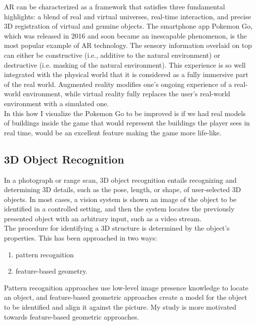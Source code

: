 \documentclass[a4paper]{report}
\begin{document}
AR can be characterized as a framework that satisfies three fundamental highlights: a blend of real and virtual universes, real-time interaction, and precise 3D registration of virtual and genuine objects. The smartphone app Pokemon Go, which was released in 2016 and soon became an inescapable phenomenon, is the most popular example of AR technology.
The sensory information overlaid on top can either be constructive (i.e., additive to the natural environment) or destructive (i.e. masking of the natural environment).
This experience is so well integrated with the physical world that it is considered as a fully immersive part of the real world. Augmented reality modifies one's ongoing experience of a real-world environment, while virtual reality fully replaces the user's real-world environment with a simulated one.
\\
In this how I visualize the Pokemon Go to be improved is if we had real models of buildings inside the game that would represent the buildings the player sees in real time, would be an excellent feature making the game more life-like.
\newpage

\subsection{3D  Object Recognition}
In a photograph or range scan, 3D object recognition entails recognizing and determining 3D details, such as the pose, length, or shape, of user-selected 3D objects. In most cases, a vision system is shown an image of the object to be identified in a controlled setting, and then the system locates the previously presented object with an arbitrary input, such as a video stream.
\\
The procedure for identifying a 3D structure is determined by the object's properties. This has been approached in two ways: 
\begin{center}
\begin{enumerate}
  \item pattern recognition 
  \item feature-based geometry.
\end{enumerate}
 \end{center} 
 Pattern recognition  approaches use low-level image presence knowledge to locate an object, and feature-based geometric approaches create a model for the object to be identified and align it against the picture. My study is more motivated towards  feature-based geometric approaches.
\end{document}

